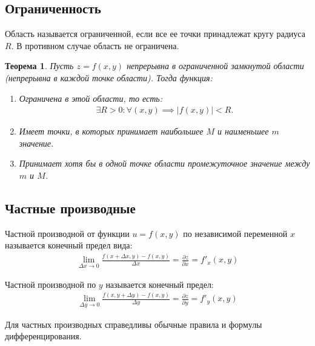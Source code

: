 \documentclass[a4paper,12pt,oneside]{extbook}
\theoremstyle{numbered}
\theoremstyle{unnumbered}
\theoremstyle{named}
\newtheorem{theorem}{Теорема}[section]
\theoremstyle{unnumbered}
\theoremstyle{named}
\theoremstyle{named}
\theoremstyle{named}
\begin{document}
\subsection{Ограниченность}%
\label{sub:Ограниченность}
\begin{siderules}
    Область называется ограниченной, если все ее точки принадлежат кругу радиуса \(R\). В противном случае область не ограничена.
\end{siderules}

\begin{theorem}
    Пусть \(z = f(x, y)\) непрерывна в ограниченной замкнутой области (непрерывна в каждой точке области). Тогда функция:
    \begin{enumerate}
        \item {
              Ограничена в этой области, то есть:
              \begin{gather*}
                  \exists R > 0 : \forall (x, y) \implies |f(x, y)| < R.
              \end{gather*}
              }
        \item {
              Имеет точки, в которых принимает наибольшее \(M\) и наименьшее \(m\) значение.
              }
        \item {
              Принимает хотя бы в одной точке области промежуточное значение между \(m\) и \(M\).
              }
    \end{enumerate}
\end{theorem}


\subsection{Частные производные}%
\label{sub:Частные производные}

\begin{siderules}
    Частной производной от функции \(u = f(x, y)\) по независимой переменной \(x\) называется конечный предел вида:
    \begin{gather*}
        \lim_{\Delta x \to 0}{\frac{f(x + \Delta x, y) - f(x, y)}{\Delta x}} = \frac{\partial z}{\partial x} = f'_x (x, y)
    \end{gather*}

    Частной производной по \(y\) называется конечный предел:
    \begin{gather*}
        \lim_{\Delta y \to 0}{\frac{f(x, y + \Delta y) - f(x, y)}{\Delta y}} = \frac{\partial z}{\partial y} = f'_y (x, y)
    \end{gather*}

    Для частных производных справедливы обычные правила и формулы дифференцирования.
\end{siderules}
\end{document}
